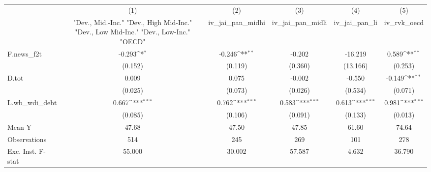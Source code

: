 {
\def\sym#1{\ifmmode^{#1}\else\(^{#1}\)\fi}
\begin{tabular}{l*{5}{c}}
\toprule
            &\multicolumn{1}{c}{(1)}&\multicolumn{1}{c}{(2)}&\multicolumn{1}{c}{(3)}&\multicolumn{1}{c}{(4)}&\multicolumn{1}{c}{(5)}\\
            &\multicolumn{1}{c}{ "Dev., Mid.-Inc." "Dev., High Mid-Inc." "Dev., Low Mid-Inc." "Dev., Low-Inc." "OECD" }&\multicolumn{1}{c}{iv\_jai\_pan\_midhi}&\multicolumn{1}{c}{iv\_jai\_pan\_midli}&\multicolumn{1}{c}{iv\_jai\_pan\_li}&\multicolumn{1}{c}{iv\_rvk\_oecd}\\
\midrule
F.news\_f2t  &      -0.293\sym{*}  &      -0.246\sym{**} &      -0.202         &     -16.219         &       0.589\sym{**} \\
            &     (0.152)         &     (0.119)         &     (0.360)         &    (13.166)         &     (0.253)         \\
\addlinespace
D.tot       &       0.009         &       0.075         &      -0.002         &      -0.550         &      -0.149\sym{**} \\
            &     (0.025)         &     (0.073)         &     (0.026)         &     (0.534)         &     (0.071)         \\
\addlinespace
L.wb\_wdi\_debt&       0.667\sym{***}&       0.762\sym{***}&       0.583\sym{***}&       0.613\sym{***}&       0.981\sym{***}\\
            &     (0.085)         &     (0.106)         &     (0.091)         &     (0.133)         &     (0.013)         \\
\midrule
Mean Y      &       47.68         &       47.50         &       47.85         &       61.60         &       74.64         \\
Observations&         514         &         245         &         269         &         101         &         278         \\
Exc. Inst. F-stat&      55.000         &      30.002         &      57.587         &       4.632         &      36.790         \\
\bottomrule
\end{tabular}
}
